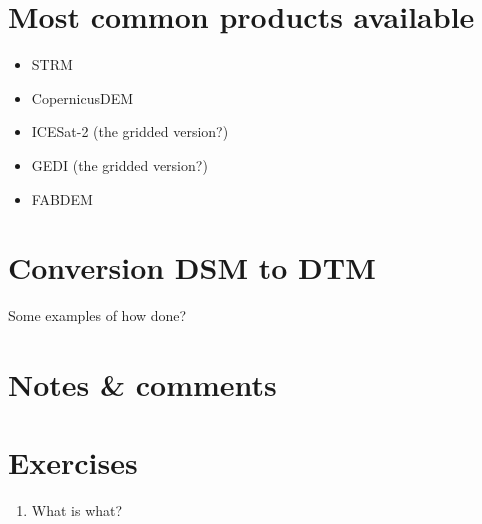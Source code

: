 %
\section[Most common products]{Most common products available}

\begin{itemize}
  \item STRM
  \item CopernicusDEM
  \item ICESat-2 (the gridded version?)
  \item GEDI (the gridded version?)
  \item FABDEM
\end{itemize}


%
\section{Conversion DSM to DTM}

Some examples of how done?

%
\section{Notes \& comments}


%
\section{Exercises}

\begin{enumerate}
  \item What is what?
\end{enumerate}
